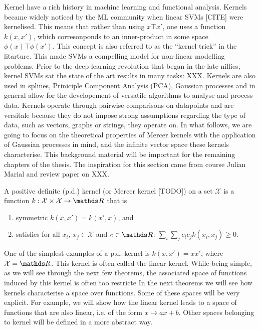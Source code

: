 Kernel have a rich history in machine learning and functional analysis. Kernels became widely noticed  by the ML community when linear SVMs [CITE] were kernelised. This means that rather than using $x\top x'$, one uses a function $k(x, x')$, which corresonponds to an inner-product in some space $\phi(x)\top \phi(x')$. This concept is also referred to as the ``kernel trick'' in the litarture. This made SVMs a compelling model for non-linear modelling problems. Prior to the deep learning revolution that began in the late nillies, kernel SVMs sat the state of the art results in many tasks: XXX. Kernels are also used in splines, Priniciple Component Analysis (PCA), Gaussian processes and in general allow for the developement of versatile algorithms to analyse and process data. Kernels operate through pairwise comparisons on datapoints and are versitale because they do not impose strong assumptions regarding the type of data, such as vectors, graphs or strings, they operate on. In what follows, we are going to focus on the theoretical properties of Mercer kernels with the application of Gaussian processes in mind, and the infinite vector space these kernels characterise. This background material will be important for the remaining chapters of the thesis. The inspiration for this section came from course Julian Marial and review paper on XXX.

\begin{definition}
A positive definite (p.d.) kernel (or Mercer kernel [TODO]) on a set $\mathcal{X}$ is a function $k: \mathcal{X} \times \mathcal{X} \rightarrow \Reals$ that is
\begin{enumerate}
  \item symmetric $k(x, x') = k(x', x)$, and
  \item satisfies for all $x_i$, $x_j \in \mathcal{X}$ and $c \in \Reals$: $\sum_{i}\sum_j c_i c_j k(x_i, x_j)\ge 0$.
\end{enumerate}
\end{definition}
One of the simplest examples of a p.d. kernel is $k(x, x') = xx'$, where $\mathcal{X} = \Reals$. This kernel is often called the linear kernel. While being simple, as we will see through the next few theorems, the associated space of functions induced by this kernel is often too restricte
In the next theorems we will see how kernels characterise a space over functions. Some of these spaces will be very explicit. For example, we will show how the linear kernel leads to a space of functions that are also linear, i.e. of the form $x \mapsto a x + b$. Other spaces belonging to kernel will be defined in a more abstract way. 

